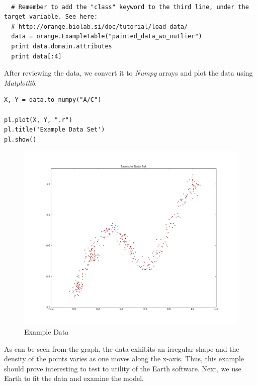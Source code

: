 \begin{lstlisting}[caption={Load and Inspect the Data},label=lst:expected_times,firstnumber=15]

  # Remember to add the "class" keyword to the third line, under the target variable. See here:
  # http://orange.biolab.si/doc/tutorial/load-data/
  data = orange.ExampleTable("painted_data_wo_outlier")
  print data.domain.attributes
  print data[:4]
\end{lstlisting}

After reviewing the data, we convert it to \emph{Numpy} arrays and plot the data using \emph{Matplotlib}.

\begin{lstlisting}[caption={Convert to Array and Plot},label=2nd,firstnumber=21]
X, Y = data.to_numpy("A/C")

pl.plot(X, Y, ".r")
pl.title('Example Data Set')
pl.show()

\end{lstlisting}



\begin{figure}[H]
    \centering
       \includegraphics[width=6.5in]{example_data.png}
    \caption{Example Data}
    \label{Example Data}
\end{figure}

As can be seen from the graph, the data exhibits an irregular shape and the density of the points varies as one moves along the x-axis. Thus, this example should prove interesting to test to utility of the Earth software. Next, we use Earth to fit the data and examine the model. 

